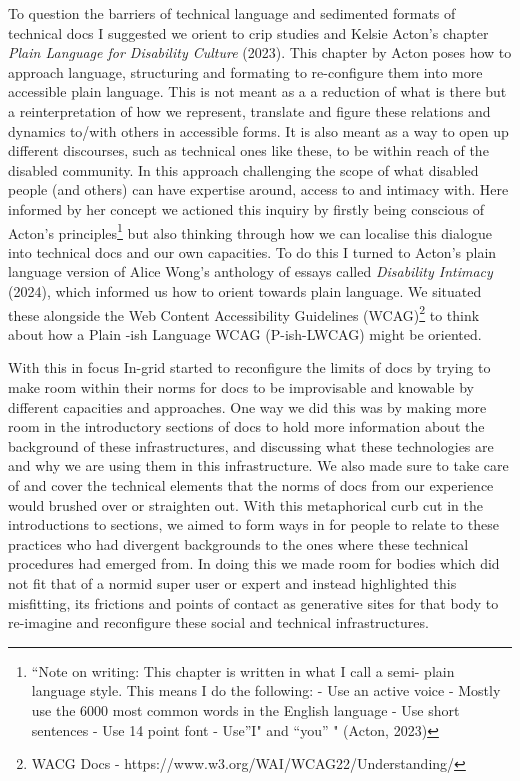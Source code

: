 To question the barriers of technical language and sedimented formats of
technical docs I suggested we orient to crip studies and Kelsie Acton's
chapter \emph{Plain Language for Disability Culture} (2023). This
chapter by Acton poses how to approach language, structuring and
formating to re-configure them into more accessible plain language. This
is not meant as a a reduction of what is there but a reinterpretation of
how we represent, translate and figure these relations and dynamics
to/with others in accessible forms. It is also meant as a way to open up
different discourses, such as technical ones like these, to be within
reach of the disabled community. In this approach challenging the scope
of what disabled people (and others) can have expertise around, access
to and intimacy with. Here informed by her concept we actioned this
inquiry by firstly being conscious of Acton's principles\footnote{``Note
  on writing: This chapter is written in what I call a semi- plain
  language style. This means I do the following: - Use an active voice -
  Mostly use the 6000 most common words in the English language - Use
  short sentences - Use 14 point font - Use''I" and ``you'' " (Acton,
  2023)} but also thinking through how we can localise this dialogue
into technical docs and our own capacities. To do this I turned to
Acton's plain language version of Alice Wong's anthology of essays
called \emph{Disability Intimacy} (2024), which informed us how to
orient towards plain language. We situated these alongside the Web
Content Accessibility Guidelines (WCAG)\footnote{WACG Docs -
  https://www.w3.org/WAI/WCAG22/Understanding/} to think about how a
Plain -ish Language WCAG (P-ish-LWCAG) might be oriented.

With this in focus In-grid started to reconfigure the limits of docs by
trying to make room within their norms for docs to be improvisable and
knowable by different capacities and approaches. One way we did this was
by making more room in the introductory sections of docs to hold more
information about the background of these infrastructures, and
discussing what these technologies are and why we are using them in this
infrastructure. We also made sure to take care of and cover the
technical elements that the norms of docs from our experience would
brushed over or straighten out. With this metaphorical curb cut in the
introductions to sections, we aimed to form ways in for people to relate
to these practices who had divergent backgrounds to the ones where these
technical procedures had emerged from. In doing this we made room for
bodies which did not fit that of a normid super user or expert and
instead highlighted this misfitting, its frictions and points of contact
as generative sites for that body to re-imagine and reconfigure these
social and technical infrastructures.

